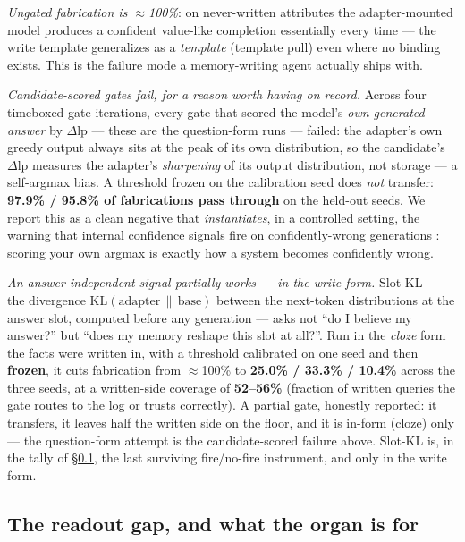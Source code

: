 \documentclass[11pt]{article}
\newcommand{\dlp}{\Delta\mathrm{lp}}
\begin{document}
\emph{Ungated fabrication is $\approx$100\%}: on never-written attributes the adapter-mounted
model produces a confident value-like completion essentially every time --- the write template
generalizes as a \emph{template} (template pull) even where no binding exists. This is the
failure mode a memory-writing agent actually ships with.

\emph{Candidate-scored gates fail, for a reason worth having on record.} Across four timeboxed
gate iterations, every gate that scored the model's \emph{own generated answer} by $\dlp$ ---
these are the question-form runs --- failed: the adapter's own greedy output always sits at the
peak of its own distribution, so the
candidate's $\dlp$ measures the adapter's \emph{sharpening} of its output distribution, not
storage --- a self-argmax bias. A threshold frozen on the calibration seed does \emph{not}
transfer: \textbf{97.9\% / 95.8\% of fabrications pass through} on the held-out seeds. We report
this as a clean negative that \emph{instantiates}, in a controlled setting, the warning that
internal confidence signals fire on confidently-wrong generations \citep{confidentwrong2025}:
scoring your own argmax is exactly how a system becomes confidently wrong.

\emph{An answer-independent signal partially works --- in the write form.} Slot-KL --- the
divergence
$\mathrm{KL}(\mathrm{adapter}\,\|\,\mathrm{base})$ between the next-token distributions at the
answer slot, computed before any generation --- asks not ``do I believe my answer?'' but ``does
my memory reshape this slot at all?''. Run in the \emph{cloze} form the facts were written in,
with a threshold calibrated on one seed and then
\textbf{frozen},
it cuts fabrication from $\approx$100\% to \textbf{25.0\% / 33.3\% / 10.4\%} across the three
seeds, at a written-side coverage of \textbf{52--56\%} (fraction of written queries the gate
routes to the log or trusts correctly). A partial gate, honestly reported: it transfers, it
leaves half the written side on the floor, and it is in-form (cloze) only --- the question-form
attempt is the candidate-scored failure above. Slot-KL is, in the tally of
\S\ref{sec:readoutgap}, the last surviving fire/no-fire instrument, and only in the write form.

\subsection{The readout gap, and what the organ is for}\label{sec:readoutgap}
\end{document}
